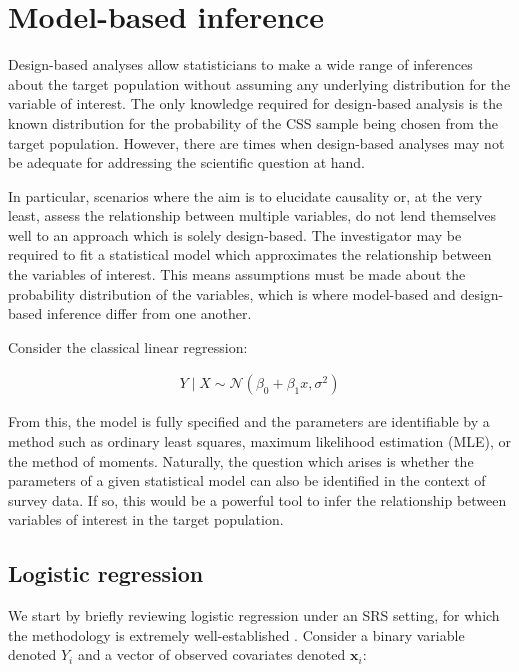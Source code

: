\section{Model-based inference}

Design-based analyses allow statisticians to make a wide range of inferences about the target population without assuming any underlying distribution for the variable of interest. The only knowledge required for design-based analysis is the known distribution for the probability of the CSS sample being chosen from the target population. However, there are times when design-based analyses may not be adequate for addressing the scientific question at hand. 

In particular, scenarios where the aim is to elucidate causality or, at the very least, assess the relationship between multiple variables, do not lend themselves well to an approach which is solely design-based. The investigator may be required to fit a statistical model which approximates the relationship between the variables of interest. This means assumptions must be made about the probability distribution of the variables, which is where model-based and design-based inference differ from one another. 

Consider the classical linear regression:

\begin{align*}
\label{eq:linear-reg}
Y \mid X \sim \mathcal{N}(\beta_{0} + \beta_{1} x, \sigma^{2})
\end{align*}

From this, the model is fully specified and the parameters are identifiable by a method such as ordinary least squares, maximum likelihood estimation (MLE), or the method of moments. Naturally, the question which arises is whether the parameters of a given statistical model can also be identified in the context of survey data. If so, this would be a powerful tool to infer the relationship between variables of interest in the target population.

\subsection{Logistic regression}

We start by briefly reviewing logistic regression under an SRS setting, for which the methodology is extremely well-established \citep{mccullagh1989}. Consider a binary variable denoted $Y_{i}$ and a vector of observed covariates denoted $\mathbf{x}_{i}$:

